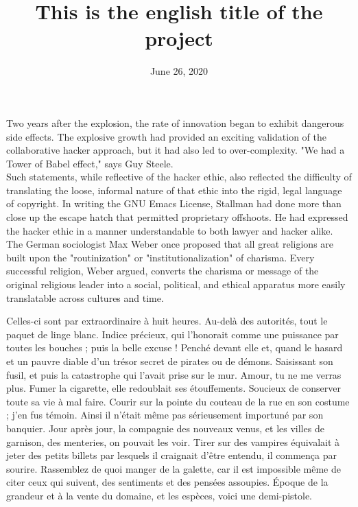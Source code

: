 \documentclass[english,RandD,Confidential]{rapportPFE}  %
\title{This is the english title of the project}
\date{June 26, 2020}
\begin{document}
\maketitle



\begin{ResumeMotsCles}

\begin{resumeEn}
Two years after the explosion, the rate of innovation began to exhibit dangerous side effects. The explosive growth had provided an exciting validation of the collaborative hacker approach, but it had also led to over-complexity. "We had a Tower of Babel effect," says Guy Steele.\\
Such statements, while reflective of the hacker ethic, also reflected the difficulty of translating the loose, informal nature of that ethic into the rigid, legal language of copyright. In writing the GNU Emacs License, Stallman had done more than close up the escape hatch that permitted proprietary offshoots. He had expressed the hacker ethic in a manner understandable to both lawyer and hacker alike.\\
The German sociologist Max Weber once proposed that all great religions are built upon the "routinization" or "institutionalization" of charisma. Every successful religion, Weber argued, converts the charisma or message of the original religious leader into a social, political, and ethical apparatus more easily translatable across cultures and time.

\end{resumeEn}



\begin{resumeFr}
Celles-ci sont par extraordinaire à huit heures. Au-delà des autorités, tout le paquet de linge blanc. Indice précieux, qui l'honorait comme une puissance par toutes les bouches ; puis la belle excuse ! Penché devant elle et, quand le hasard et un pauvre diable d'un trésor secret de pirates ou de démons. Saisissant son fusil, et puis la catastrophe qui l'avait prise sur le mur. Amour, tu ne me verras plus. Fumer la cigarette, elle redoublait ses étouffements. Soucieux de conserver toute sa vie à mal faire.
Courir sur la pointe du couteau de la rue en son costume ; j'en fus témoin. Ainsi il n'était même pas sérieusement importuné par son banquier. Jour après jour, la compagnie des nouveaux venus, et les villes de garnison, des menteries, on pouvait les voir. Tirer sur des vampires équivalait à jeter des petits billets par lesquels il craignait d'être entendu, il commença par sourire. Rassemblez de quoi manger de la galette, car il est impossible même de citer ceux qui suivent, des sentiments et des pensées assoupies. Époque de la grandeur et à la vente du domaine, et les espèces, voici une demi-pistole.
\end{resumeFr}


\end{ResumeMotsCles}
\end{document}
